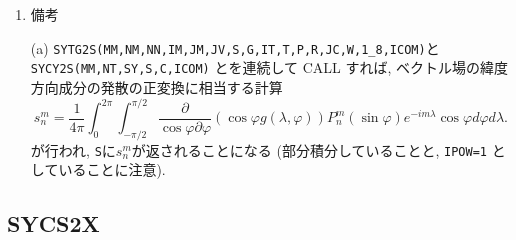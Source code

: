 \documentclass[a4j]{jsarticle}
\begin{document}
\begin{enumerate}
\item 備考

  (a) \texttt{SYTG2S(MM,NM,NN,IM,JM,JV,S,G,IT,T,P,R,JC,W,1\_8,ICOM)}と
    \texttt{SYCY2S(MM,NT,SY,S,C,ICOM)} とを連続して CALL すれば,
    ベクトル場の緯度方向成分の発散の正変換に相当する計算
\begin{equation}
s^m_n=\frac1{4\pi}\int^{2\pi}_0\int^{\pi/2}_{-\pi/2}
\frac{\partial}{\cos\varphi\partial\varphi}
\left(\cos\varphi g(\lambda,\varphi)\right)
P^m_n(\sin\varphi)
e^{-im\lambda}\cos\varphi d\varphi
d\lambda .
\end{equation}
が行われ, \texttt{S}に$s^m_n$が返されることになる
(部分積分していることと, \texttt{IPOW=1} としていることに注意).
    
\end{enumerate}


\subsection{SYCS2X}
\end{document}
